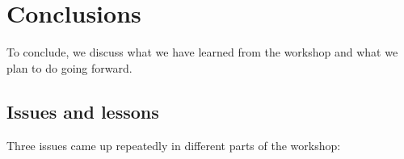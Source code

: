 \documentclass[11pt, oneside]{amsart}
\newcommand{\todo}[1]{{\color{blue}$\blacksquare$~\textsf{[TODO: #1]}}}
\newcommand{\note}[1]{ {\textcolor{red}    { #1 }}}
\begin{document}


\section{Conclusions} \label{sec:conclusions}

To conclude, we discuss what we have learned from the workshop and what we plan to do going forward.





\subsection{Issues and lessons}


Three issues came up repeatedly in different parts of the workshop:
\end{document}
